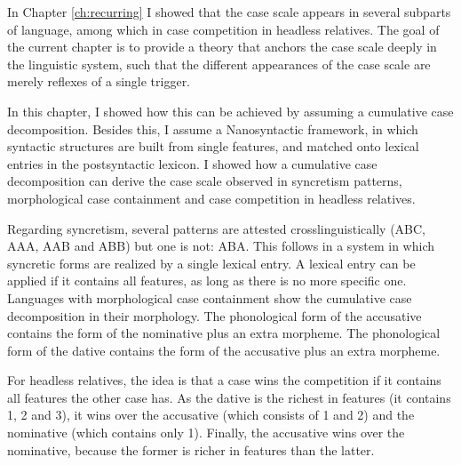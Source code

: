 In Chapter \ref{ch:recurring} I showed that the case scale appears in several subparts of language, among which in case competition in headless relatives. The goal of the current chapter is to provide a theory that anchors the case scale deeply in the linguistic system, such that the different appearances of the case scale are merely reflexes of a single trigger.

In this chapter, I showed how this can be achieved by assuming a cumulative case decomposition. Besides this, I assume a Nanosyntactic framework, in which syntactic structures are built from single features, and matched onto lexical entries in the postsyntactic lexicon.
I showed how a cumulative case decomposition can derive the case scale observed in syncretism patterns, morphological case containment and case competition in headless relatives.

Regarding syncretism, several patterns are attested crosslinguistically (ABC, AAA, AAB and ABB) but one is not: ABA. This follows in a system in which syncretic forms are realized by a single lexical entry. A lexical entry can be applied if it contains all features, as long as there is no more specific one.
Languages with morphological case containment show the cumulative case decomposition in their morphology. The phonological form of the accusative contains the form of the nominative plus an extra morpheme. The phonological form of the dative contains the form of the accusative plus an extra morpheme.

For headless relatives, the idea is that a case wins the competition if it contains all features the other case has. As the dative is the richest in features (it contains 1, 2 and 3), it wins over the accusative (which consists of 1 and 2) and the nominative (which contains only 1). Finally, the accusative wins over the nominative, because the former is richer in features than the latter.
